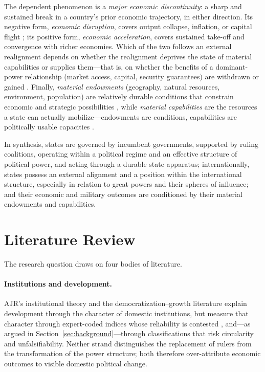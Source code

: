 \documentclass[11pt]{article}
\begin{document}
The dependent phenomenon is a \emph{major economic discontinuity}: a sharp and sustained break in a country's prior economic trajectory, in either direction. Its negative form, \emph{economic disruption}, covers output collapse, inflation, or capital flight \parencite{rodrik_1999}; its positive form, \emph{economic acceleration}, covers sustained take-off and convergence with richer economies. Which of the two follows an external realignment depends on whether the realignment deprives the state of material capabilities or supplies them---that is, on whether the benefits of a dominant-power relationship (market access, capital, security guarantees) are withdrawn or gained \parencite{lake_2009,gilpin_1981}. Finally, \emph{material endowments} (geography, natural resources, environment, population) are relatively durable conditions that constrain economic and strategic possibilities \parencite{diamond_1997}, while \emph{material capabilities} are the resources a state can actually mobilize---endowments are conditions, capabilities are politically usable capacities \parencite{mearsheimer_2001}.

In synthesis, states are governed by incumbent governments, supported by ruling coalitions, operating within a political regime and an effective structure of political power, and acting through a durable state apparatus; internationally, states possess an external alignment and a position within the international structure, especially in relation to great powers and their spheres of influence; and their economic and military outcomes are conditioned by their material endowments and capabilities.

\section{Literature Review}
\label{sec:lit_review}

The research question draws on four bodies of literature.

\paragraph{Institutions and development.} AJR's institutional theory \parencite{acemoglu_johnson_robinson_2001,acemoglu_johnson_robinson_2005,acemoglu_robinson_2012} and the democratization--growth literature \parencite{acemoglu_naidu_restrepo_robinson_2019} explain development through the character of domestic institutions, but measure that character through expert-coded indices whose reliability is contested \parencite{treier_jackman_2008,little_meng_2024}, and---as argued in Section~\ref{sec:background}---through classifications that risk circularity and unfalsifiability. Neither strand distinguishes the replacement of rulers from the transformation of the power structure; both therefore over-attribute economic outcomes to visible domestic political change.
\end{document}
